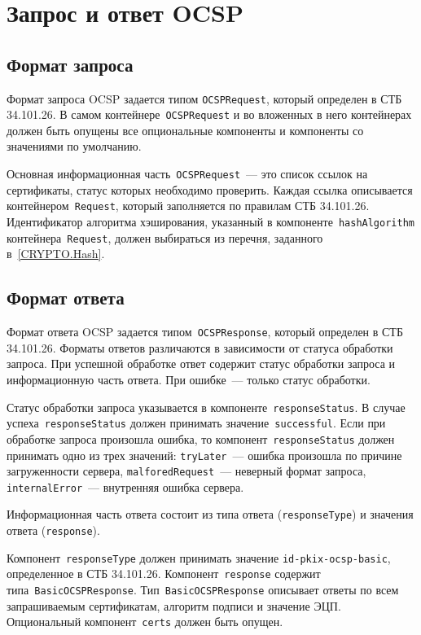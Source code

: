 \section{Запрос и ответ OCSP}\label{FMT.OCSP}

\subsection{Формат запроса}

Формат запроса OCSP задается типом \texttt{OCSPRequest}, который определен 
в СТБ 34.101.26. В самом контейнере~\texttt{OCSPRequest} и во вложенных в него
контейнерах должен быть опущены все опциональные компоненты и компоненты 
со значениями по умолчанию.

Основная информационная часть~\texttt{OCSPRequest}~--- это список ссылок
на сертификаты, статус которых необходимо проверить.
%
Каждая ссылка описывается контейнером~\texttt{Request}, который заполняется
по правилам СТБ 34.101.26. Идентификатор алгоритма хэширования, указанный в
компоненте~\texttt{hashAlgorithm} контейнера~\texttt{Request}, должен
выбираться из перечня, заданного в~\ref{CRYPTO.Hash}.

\subsection{Формат ответа}

Формат ответа OCSP задается типом~\texttt{OCSPResponse}, который определен 
в СТБ 34.101.26.  Форматы ответов различаются в зависимости от статуса 
обработки запроса. При успешной обработке ответ содержит статус обработки 
запроса и информационную часть ответа. При ошибке~--- только статус обработки.

Статус обработки запроса указывается в компоненте~\texttt{responseStatus}.
%
В случае успеха~\texttt{responseStatus} должен принимать значение~\texttt{successful}.
%
Если при обработке запроса произошла ошибка, то 
компонент~\texttt{responseStatus} должен принимать одно из трех значений: 
\texttt{tryLater}~--- ошибка произошла по причине загруженности сервера, 
\texttt{malforedRequest}~--- неверный формат запроса, 
\texttt{internalError}~--- внутренняя ошибка сервера.

Информационная часть ответа состоит из типа ответа
(\texttt{responseType}) и значения ответа (\texttt{response}).
 
Компонент~\texttt{responseType} должен принимать значение
\texttt{id-pkix-ocsp-basic}, определенное в СТБ 34.101.26. 
Компонент~\texttt{response} содержит  
типа~\texttt{BasicOCSPResponse}. Тип~\texttt{BasicOCSPResponse} описывает 
ответы по всем запрашиваемым сертификатам, алгоритм подписи и значение  
ЭЦП. Опциональный компонент~\texttt{certs} должен быть опущен.

